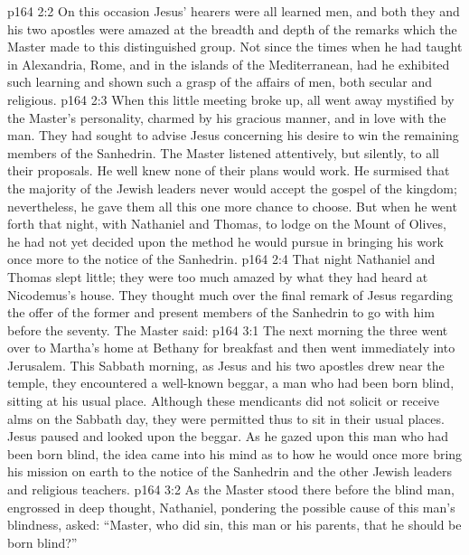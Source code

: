\vs p164 2:2 On this occasion Jesus’ hearers were all learned men, and both they and his two apostles were amazed at the breadth and depth of the remarks which the Master made to this distinguished group. Not since the times when he had taught in Alexandria, Rome, and in the islands of the Mediterranean, had he exhibited such learning and shown such a grasp of the affairs of men, both secular and religious.
\vs p164 2:3 When this little meeting broke up, all went away mystified by the Master’s personality, charmed by his gracious manner, and in love with the man. They had sought to advise Jesus concerning his desire to win the remaining members of the Sanhedrin. The Master listened attentively, but silently, to all their proposals. He well knew none of their plans would work. He surmised that the majority of the Jewish leaders never would accept the gospel of the kingdom; nevertheless, he gave them all this one more chance to choose. But when he went forth that night, with Nathaniel and Thomas, to lodge on the Mount of Olives, he had not yet decided upon the method he would pursue in bringing his work once more to the notice of the Sanhedrin.
\vs p164 2:4 That night Nathaniel and Thomas slept little; they were too much amazed by what they had heard at Nicodemus’s house. They thought much over the final remark of Jesus regarding the offer of the former and present members of the Sanhedrin to go with him before the seventy. The Master said: 
\vs p164 3:1 The next morning the three went over to Martha’s home at Bethany for breakfast and then went immediately into Jerusalem. This Sabbath morning, as Jesus and his two apostles drew near the temple, they encountered a well\hyp{}known beggar, a man who had been born blind, sitting at his usual place. Although these mendicants did not solicit or receive alms on the Sabbath day, they were permitted thus to sit in their usual places. Jesus paused and looked upon the beggar. As he gazed upon this man who had been born blind, the idea came into his mind as to how he would once more bring his mission on earth to the notice of the Sanhedrin and the other Jewish leaders and religious teachers.
\vs p164 3:2 As the Master stood there before the blind man, engrossed in deep thought, Nathaniel, pondering the possible cause of this man’s blindness, asked: “Master, who did sin, this man or his parents, that he should be born blind?”
